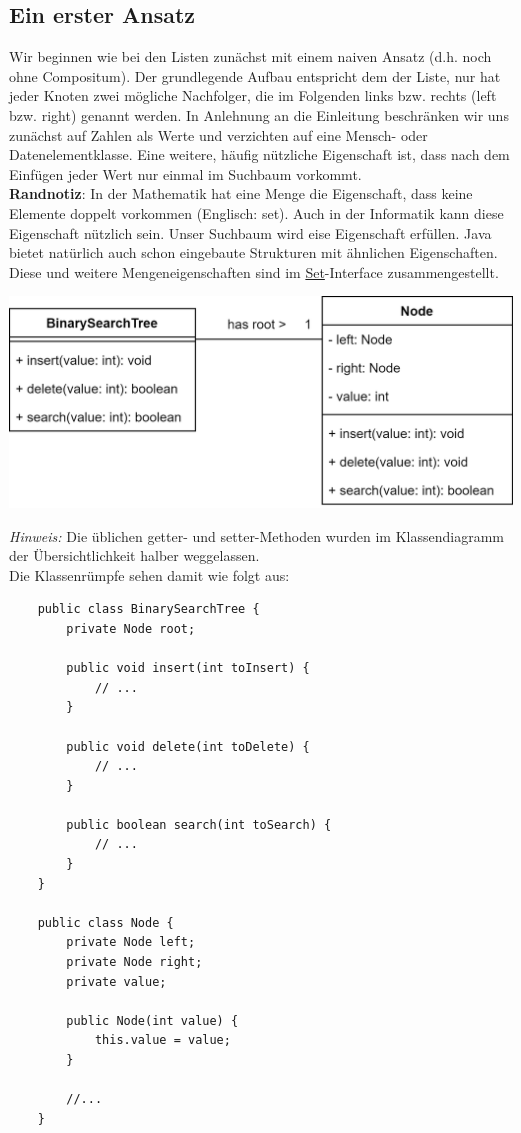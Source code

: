 \documentclass{article}
\begin{document}
\subsection{Ein erster Ansatz}

Wir beginnen wie bei den Listen zunächst mit einem naiven Ansatz (d.h. noch ohne Compositum). Der grundlegende Aufbau entspricht dem der Liste, nur hat jeder Knoten zwei mögliche Nachfolger, die im Folgenden links bzw. rechts (left bzw. right) genannt werden. In Anlehnung an die Einleitung beschränken wir uns zunächst auf Zahlen als Werte und verzichten auf eine Mensch- oder Datenelementklasse. Eine weitere, häufig nützliche Eigenschaft ist, dass nach dem Einfügen jeder Wert nur einmal im Suchbaum vorkommt. \\
\textbf{Randnotiz}: In der Mathematik hat eine Menge die Eigenschaft, dass keine Elemente doppelt vorkommen (Englisch: set). Auch in der Informatik kann diese Eigenschaft nützlich sein. Unser Suchbaum wird eise Eigenschaft erfüllen. Java bietet natürlich auch schon eingebaute Strukturen mit ähnlichen Eigenschaften. Diese und weitere Mengeneigenschaften sind im \href{https://docs.oracle.com/javase/7/docs/api/java/util/Set.html}{Set}-Interface zusammengestellt.
\begin{center}
    \includegraphics[scale=0.25]{../media/bin_tree_basic.png}
\end{center}
\textit{Hinweis:} Die üblichen getter- und setter-Methoden wurden im Klassendiagramm der Übersichtlichkeit halber weggelassen. \\
Die Klassenrümpfe sehen damit wie folgt aus:
\begin{verbatim}
    public class BinarySearchTree {
        private Node root;

        public void insert(int toInsert) {
            // ... 
        }

        public void delete(int toDelete) {
            // ...
        }

        public boolean search(int toSearch) {
            // ...
        }
    }

    public class Node {
        private Node left;
        private Node right;
        private value; 

        public Node(int value) {
            this.value = value;
        }

        //...
    }
\end{verbatim}
\end{document}
